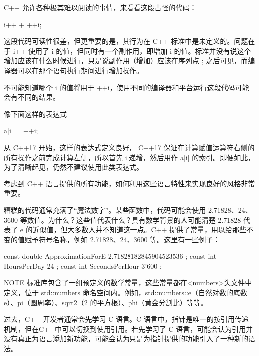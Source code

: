 
C++ 允许各种极其难以阅读的事情，来看看这段古怪的代码：

\begin{cpp}
i++ + ++i;
\end{cpp}

这段代码可读性很差，但更重要的是，其行为在 C++ 标准中是未定义的。问题在于 i++ 使用了 i 的值，但同时有一个副作用，即增加 i 的值。标准并没有说这个增加应该在什么时候进行，只是说副作用（增加）应该在序列点 ; 之后可见，而编译器可以在那个语句执行期间进行增加操作。

不可能知道哪个 i 的值将用于 ++i，使用不同的编译器和平台运行这段代码可能会有不同的结果。

像下面这样的表达式

\begin{cpp}
a[i] = ++i;
\end{cpp}

从 C++17 开始，这样的表达式定义良好， C++17 保证在计算赋值运算符右侧的所有操作之前完成计算左侧，所以首先 i 递增，然后用作 a[i] 的索引。即便如此，为了清晰起见，仍然不建议使用此类表达式。

考虑到 C++ 语言提供的所有功能，如何利用这些语言特性来实现良好的风格非常重要。


糟糕的代码通常充满了“魔法数字”。某些函数中，代码可能会使用 2.71828、24、3600 等数值。为什么？这些值代表什么？具有数学背景的人可能清楚 2.71828 代表了 e 的近似值，但大多数人并不知道这一点。C++ 提供了常量，用以给那些不变的值赋予符号名称，例如 2.71828、24、3600 等。这里有一些例子：

\begin{cpp}
const double ApproximationForE { 2.71828182845904523536 };
const int HoursPerDay { 24 };
const int SecondsPerHour { 3'600 };
\end{cpp}

\begin{myNotic}{NOTE}
标准库包含了一组预定义的数学常量，这些常量都在<numbers>头文件中定义，位于 std::numbers 命名空间内。例如，std::numbers::e（自然对数的底数 e）、pi（圆周率）、sqrt2（2 的平方根）、phi（黄金分割比）等等。
\end{myNotic}


过去，C++ 开发者通常会先学习 C 语言。C 语言中，指针是唯一的按引用传递机制，但在C++中可以切换到使用引用。若先学习了 C 语言，可能会认为引用并没有真正为语言添加新功能，可能会认为只是为指针提供的功能引入了一种新的语法。

